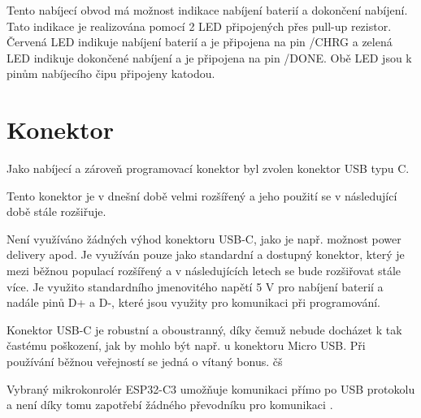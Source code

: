 Tento nabíjecí obvod má možnost indikace nabíjení baterií a dokončení nabíjení. Tato indikace je realizována pomocí 2 LED připojených přes pull-up rezistor. Červená 
LED indikuje nabíjení baterií a je připojena na pin /CHRG a zelená LED indikuje dokončené nabíjení a je připojena na pin /DONE. Obě LED jsou k pinům nabíjecího čipu 
připojeny katodou. 

\section{Konektor}
Jako nabíjecí a zároveň programovací konektor byl zvolen konektor USB typu C.

Tento konektor je v dnešní době velmi rozšířený a jeho použití se v následující době stále rozšiřuje. 

Není využíváno žádných výhod konektoru USB-C, jako je např. možnost power delivery apod. Je využíván pouze jako standardní a dostupný konektor, který je mezi běžnou
populací rozšířený a v následujících letech se bude rozšiřovat stále více. Je využito standardního jmenovitého napětí 5 V pro nabíjení baterií a nadále pinů D+ a D-, 
které jsou využity pro komunikaci při programování. 

Konektor USB-C je robustní a oboustranný, díky čemuž nebude docházet k tak častému poškození, jak by mohlo být např. u konektoru Micro USB. Při používání běžnou veřejností
se jedná o vítaný bonus. čš

Vybraný mikrokonrolér ESP32-C3 umožňuje komunikaci přímo po USB protokolu a není díky tomu zapotřebí žádného převodníku pro komunikaci \cite{ESP_C3_dtsh}. %

